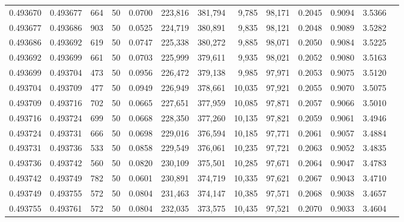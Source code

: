 \begin{tabular}{rrrrrrrrrrrrr}
0.493670 & 0.493677 &   664 &  50 &                                     0.0700 & 223,816 & 381,794 &   9,785 &  98,171 & 0.2045 & 0.9094 & 3.5366 \\
0.493677 & 0.493686 &   903 &  50 &                                     0.0525 & 224,719 & 380,891 &   9,835 &  98,121 & 0.2048 & 0.9089 & 3.5282 \\
0.493686 & 0.493692 &   619 &  50 &                                     0.0747 & 225,338 & 380,272 &   9,885 &  98,071 & 0.2050 & 0.9084 & 3.5225 \\
0.493692 & 0.493699 &   661 &  50 &                                     0.0703 & 225,999 & 379,611 &   9,935 &  98,021 & 0.2052 & 0.9080 & 3.5163 \\
0.493699 & 0.493704 &   473 &  50 &                                     0.0956 & 226,472 & 379,138 &   9,985 &  97,971 & 0.2053 & 0.9075 & 3.5120 \\
0.493704 & 0.493709 &   477 &  50 &                                     0.0949 & 226,949 & 378,661 &  10,035 &  97,921 & 0.2055 & 0.9070 & 3.5075 \\
0.493709 & 0.493716 &   702 &  50 &                                     0.0665 & 227,651 & 377,959 &  10,085 &  97,871 & 0.2057 & 0.9066 & 3.5010 \\
0.493716 & 0.493724 &   699 &  50 &                                     0.0668 & 228,350 & 377,260 &  10,135 &  97,821 & 0.2059 & 0.9061 & 3.4946 \\
0.493724 & 0.493731 &   666 &  50 &                                     0.0698 & 229,016 & 376,594 &  10,185 &  97,771 & 0.2061 & 0.9057 & 3.4884 \\
0.493731 & 0.493736 &   533 &  50 &                                     0.0858 & 229,549 & 376,061 &  10,235 &  97,721 & 0.2063 & 0.9052 & 3.4835 \\
0.493736 & 0.493742 &   560 &  50 &                                     0.0820 & 230,109 & 375,501 &  10,285 &  97,671 & 0.2064 & 0.9047 & 3.4783 \\
0.493742 & 0.493749 &   782 &  50 &                                     0.0601 & 230,891 & 374,719 &  10,335 &  97,621 & 0.2067 & 0.9043 & 3.4710 \\
0.493749 & 0.493755 &   572 &  50 &                                     0.0804 & 231,463 & 374,147 &  10,385 &  97,571 & 0.2068 & 0.9038 & 3.4657 \\
0.493755 & 0.493761 &   572 &  50 &                                     0.0804 & 232,035 & 373,575 &  10,435 &  97,521 & 0.2070 & 0.9033 & 3.4604 \\

\end{tabular}
